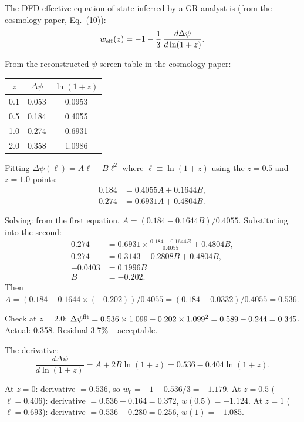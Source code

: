 \documentclass[11pt]{article}
\begin{document}
The DFD effective equation of state inferred by a GR analyst is (from
the cosmology paper, Eq.~(10)):
\begin{equation}\label{eq:weff}
  w_{\rm eff}(z) = -1 - \frac{1}{3}\,\frac{d\Delta\psi}{d\ln(1+z)}.
\end{equation}

From the reconstructed $\psi$-screen table in the cosmology paper:
\begin{center}
\begin{tabular}{ccc}
\toprule
$z$ & $\Delta\psi$ & $\ln(1+z)$ \\
\midrule
0.1 & 0.053 & 0.0953 \\
0.5 & 0.184 & 0.4055 \\
1.0 & 0.274 & 0.6931 \\
2.0 & 0.358 & 1.0986 \\
\bottomrule
\end{tabular}
\end{center}

Fitting $\Delta\psi(\ell) = A\ell + B\ell^2$ where $\ell \equiv \ln(1+z)$
using the $z = 0.5$ and $z = 1.0$ points:
\begin{align}
  0.184 &= 0.4055A + 0.1644B, \\
  0.274 &= 0.6931A + 0.4804B.
\end{align}

Solving: from the first equation, $A = (0.184 - 0.1644B)/0.4055$.
Substituting into the second:
\begin{align}
  0.274 &= 0.6931\times\frac{0.184 - 0.1644B}{0.4055} + 0.4804B, \\
  0.274 &= 0.3143 - 0.2808B + 0.4804B, \\
  -0.0403 &= 0.1996B \\
  B &= -0.202.
\end{align}
Then $A = (0.184 - 0.1644\times(-0.202))/0.4055 = (0.184 + 0.0332)/0.4055 = 0.536$.

Check at $z = 2.0$: $\Delta\psi^{\rm fit} = 0.536\times 1.099 - 0.202\times 1.099^2
= 0.589 - 0.244 = 0.345$.  Actual: 0.358.  Residual 3.7\% -- acceptable.

The derivative:
\begin{equation}
  \frac{d\Delta\psi}{d\ln(1+z)} = A + 2B\ln(1+z) = 0.536 - 0.404\ln(1+z).
\end{equation}

At $z = 0$: derivative $= 0.536$, so $w_0 = -1 - 0.536/3 = -1.179$.
At $z = 0.5$ ($\ell = 0.406$): derivative $= 0.536 - 0.164 = 0.372$,
$w(0.5) = -1.124$.
At $z = 1$ ($\ell = 0.693$): derivative $= 0.536 - 0.280 = 0.256$,
$w(1) = -1.085$.
\end{document}
